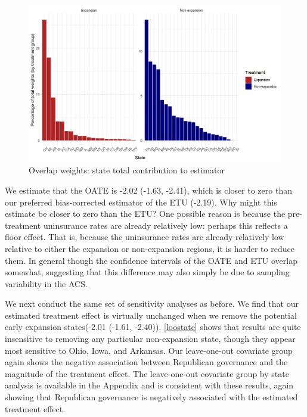 \documentclass[12pt]{article}
\begin{document}
\begin{figure}
\begin{center}
    \includegraphics[scale=0.6]{images/overlap-weights-state-weights.jpeg}
    \caption{Overlap weights: state total contribution to estimator}
    \label{oatepref}
\end{center}
\end{figure}

We estimate that the OATE is -2.02 (-1.63, -2.41), which is closer to zero than our preferred bias-corrected estimator of the ETU (-2.19). Why might this estimate be closer to zero than the ETU? One possible reason is because the pre-treatment uninsurance rates are already relatively low: perhaps this reflects a floor effect. That is, because the uninsurance rates are already relatively low relative to either the expansion or non-expansion regions, it is harder to reduce them. In general though the confidence intervals of the OATE and ETU overlap somewhat, suggesting that this difference may also simply be due to sampling variability in the ACS.

We next conduct the same set of sensitivity analyses as before. We find that our estimated treatment effect is virtually unchanged when we remove the potential early expansion states(-2.01 (-1.61, -2.40)). \ref{loostate} shows that results are quite insensitive to removing any particular non-expansion state, though they appear most sensitive to Ohio, Iowa, and Arkansas. Our leave-one-out covariate group again shows the negative association between Republican governance and the magnitude of the treatment effect. The leave-one-out covariate group by state analysis is available in the Appendix and is consistent with these results, again showing that Republican governance is negatively associated with the estimated treatment effect.
\end{document}

